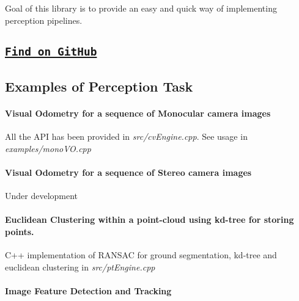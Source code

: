 Goal of this library is to provide an easy and quick way of implementing perception pipelines.



\subsection*{\href{https://github.com/towardsautonomy/TAPL}{\tt {\bfseries Find on Git\+Hub}}}

\subsection*{Examples of Perception Task}

\paragraph*{Visual Odometry for a sequence of Monocular camera images}


\begin{DoxyItemize}
\item All the A\+PI has been provided in {\itshape src/cv\+Engine.\+cpp}. See usage in {\itshape examples/mono\+V\+O.\+cpp}
\end{DoxyItemize}



\paragraph*{Visual Odometry for a sequence of Stereo camera images}


\begin{DoxyItemize}
\item Under development
\end{DoxyItemize}

\paragraph*{Euclidean Clustering within a point-\/cloud using kd-\/tree for storing points.}


\begin{DoxyItemize}
\item C++ implementation of R\+A\+N\+S\+AC for ground segmentation, kd-\/tree and euclidean clustering in {\itshape src/pt\+Engine.\+cpp}
\end{DoxyItemize}



\paragraph*{Image Feature Detection and Tracking}


